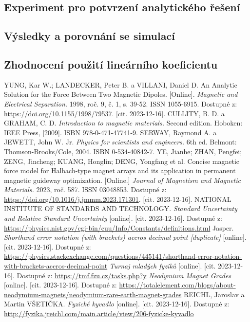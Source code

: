 \documentclass[12pt, a4paper,
 twoside,        %
 openright
]{report}
\begin{document}
\clearpage

\subsection{Experiment pro potvrzení analytického řešení}

\subsection{Výsledky a porovnání se simulací}

\subsection{Zhodnocení použití lineárního koeficientu}

\begin{thebibliography}{99}
     YUNG, Kar W.; LANDECKER, Peter B. a VILLANI, Daniel D. An Analytic Solution for the Force Between Two Magnetic Dipoles. [Online]. \textit{Magnetic and Electrical Separation.} 1998, roč. 9, č. 1, s. 39-52. ISSN 1055-6915. Dostupné z: \url{https://doi.org/10.1155/1998/79537}. [cit. 2023-12-16].
     CULLITY, B. D. a GRAHAM, C. D. \textit{Introduction to magnetic materials.} Second edition. Hoboken: IEEE Press, [2009]. ISBN 978-0-471-47741-9.
     SERWAY, Raymond A. a JEWETT, John W. Jr. \textit{Physics for scientists and engineers.} 6th ed. Belmont: Thomson-Brooks/Cole, 2004. ISBN 0-534-40842-7.
     YE, Jianhe; ZHAN, Pengfei; ZENG, Jincheng; KUANG, Honglin; DENG, Yongfang et al. Concise magnetic force model for Halbach-type magnet arrays and its application in permanent magnetic guideway optimization. [Online.] \textit{Journal of Magnetism and Magnetic Materials.} 2023, roč. 587. ISSN 03048853. Dostupné z: \url{https://doi.org/10.1016/j.jmmm.2023.171301}. [cit. 2023-12-16].
     NATIONAL INSTITUTE OF STANDARDS AND TECHNOLOGY. \textit{Standard Uncertainty and Relative Standard Uncertainty} [online]. [cit. 2023-12-16]. Dostupné z: \url{https://physics.nist.gov/cgi-bin/cuu/Info/Constants/definitions.html}
     Jasper. \textit{Shorthand error notation (with brackets) accros decimal point [duplicate]} [online]. [cit. 2023-12-16]. Dostupné z: \url{https://physics.stackexchange.com/questions/445141/shorthand-error-notation-with-brackets-accros-decimal-point}
     \textit{Turnaj mladých fyziků} [online]. [cit. 2023-12-16]. Dostupné z: \url{https://tmf.fzu.cz/tasks.php?y}
     \textit{Neodymium Magnet Grades} [online]. [cit. 2023-12-16]. Dostupné z: \url{https://totalelement.com/blogs/about-neodymium-magnets/neodymium-rare-earth-magnet-grades}
     REICHL, Jaroslav a Martin VŠETIČKA. \textit{Fyzické kyvadlo} [online]. [cit. 2023-12-16]. Dostupné z: \url{http://fyzika.jreichl.com/main.article/view/206-fyzicke-kyvadlo}



\end{thebibliography}
\end{document}
